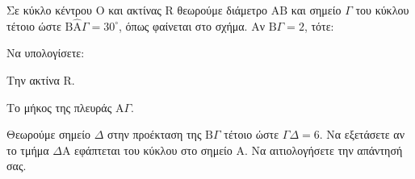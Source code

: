 Σε κύκλο κέντρου $\mathrm{O}$ και ακτίνας $\mathrm{R}$ θεωρούμε διάμετρο $\mathrm{AB}$ και σημείο $\Gamma$ του κύκλου τέτοιο ώστε $\mathrm{B}\widehat{\mathrm{A}}\Gamma = 30^\circ$, όπως φαίνεται στο σχήμα. Αν $\mathrm{B}\Gamma = 2$, τότε:
\begin{alist}
    \item Να υπολογίσετε: 
    \begin{rlist}
        \item Την ακτίνα $\mathrm{R}$.
        \item Το μήκος της πλευράς $\mathrm{A}\Gamma$.
    \end{rlist}
    \item Θεωρούμε σημείο $\Delta$ στην προέκταση της $\mathrm{B}\Gamma$ τέτοιο ώστε $\Gamma\Delta = 6$. Να εξετάσετε αν το τμήμα $\Delta\mathrm{A}$ εφάπτεται του κύκλου στο σημείο $\mathrm{A}$. Να αιτιολογήσετε την απάντησή σας. 
\end{alist}